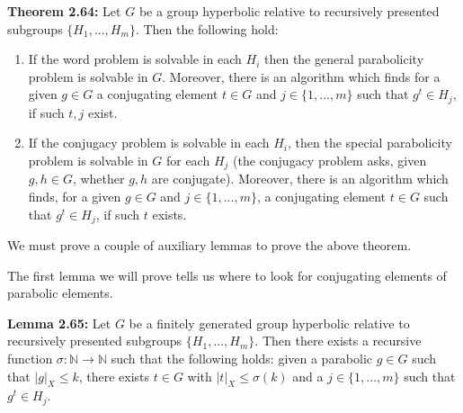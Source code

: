 \documentclass[12pt]{article}
\newcommand{\vs}{\vskip10pt}
\begin{document}
	\vs 
	
	\textbf{Theorem 2.64: } Let $G$ be a group hyperbolic relative to recursively presented subgroups $\{H_1,...,H_m\}$. Then the following hold: 
	
	\begin{enumerate}[label = (\alph*)]
		\item If the word problem is solvable in each $H_i$ then the general parabolicity problem is solvable in $G$. Moreover, there is an algorithm which finds for a given $g \in G$ a conjugating element $t \in G$ and $j \in \{1,...,m\}$ such that $g^t \in H_j$, if such $t,j$ exist. 
		\item If the conjugacy problem is solvable in each $H_i$, then the special parabolicity problem is solvable in $G$ for each $H_j$ (the conjugacy problem asks, given $g,h \in G$, whether $g,h$ are conjugate). Moreover, there is an algorithm which finds, for a given $g \in G$ and $j \in \{1,...,m\}$, a conjugating element $t \in G$ such that $g^t \in H_j$, if such $t$ exists. 
	\end{enumerate}

	We must prove a couple of auxiliary lemmas to prove the above theorem.
	
	\vs 
	
	The first lemma we will prove tells us where to look for conjugating elements of parabolic elements. 
	
	\vs 
	
	\textbf{Lemma 2.65: } Let $G$ be a finitely generated group hyperbolic relative to recursively presented subgroups $\{H_1,...,H_m\}$. Then there exists a recursive function $\sigma: \mathbb{N} \rightarrow \mathbb{N}$ such that the following holds: given a parabolic $g \in G$ such that $\vert g \vert_X \leq k$, there exists $t \in G$ with $\vert t \vert_X \leq \sigma(k)$ and a $j \in \{1,...,m\}$ such that $g^t \in H_j$.
	
\end{document}
